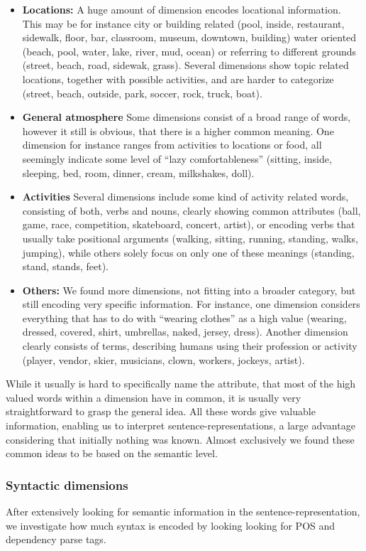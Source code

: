 \begin{itemize}
\item \textbf{Locations:} A huge amount of dimension encodes locational information. This may be for instance city or building related (pool, inside, restaurant, sidewalk, floor, bar, classroom, museum, downtown, building) water oriented (beach, pool, water, lake, river, mud, ocean) or referring to different grounds (street, beach, road, sidewak, grass). Several dimensions show topic related locations, together with possible activities, and are harder to categorize (street, beach, outside, park, soccer, rock, truck, boat).
\item \textbf{General atmosphere} Some dimensions consist of a broad range of words, however it still is obvious, that there is a higher common meaning.  One dimension for instance ranges from activities to locations or food, all seemingly indicate some level of ``lazy comfortableness'' (sitting, inside, sleeping, bed, room, dinner, cream, milkshakes, doll).
\item \textbf{Activities} Several dimensions include some kind of activity related words, consisting of both, verbs and nouns, clearly showing common attributes (ball, game, race, competition, skateboard, concert, artist), or encoding verbs that usually take positional arguments (walking, sitting, running, standing, walks, jumping), while others solely focus on only one of these meanings (standing, stand, stands, feet).
\item \textbf{Others:} We found more dimensions, not fitting into a broader category, but still encoding very specific information. For instance, one dimension considers everything that has to do with ``wearing clothes'' as a high value (wearing, dressed, covered, shirt, umbrellas, naked, jersey, dress). Another dimension clearly consists of terms, describing humans using their profession or activity (player, vendor, skier, musicians, clown, workers, jockeys, artist).
\end{itemize}

\noindent
While it usually is hard to specifically name the attribute, that most of the high valued words within a dimension have in common, it is usually very straightforward to grasp the general idea. All these words give valuable information, enabling us to interpret sentence-representations, a large advantage considering that initially nothing was known. Almost exclusively we found these common ideas to be based on the semantic level.

\subsubsection{Syntactic dimensions}
After extensively looking for semantic information in the sentence-representation, we investigate how much syntax is encoded by looking looking for \ac{POS} and dependency parse tags.


